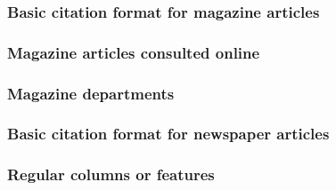 \documentclass[11pt,letterpaper,oneside]{article}
\begin{document}
\setcounter{subsubsection}{187}
\subsubsection{Basic citation format for magazine articles}

\begin{citebib}
\item \cite[48]{saulnier2008}
\item \cite[59]{lepore2015}
\end{citebib}

\subsubsection{Magazine articles consulted online}

\begin{citebib}
\item \cite{vick2015}
\item \cite[5]{hanemann1926}
\end{citebib}

\subsubsection{Magazine departments}

\begin{citebib}
\item \cite{marx2015}
\item \cite{wallraff2008}
\item \cite{gourmet2000}
\end{citebib}

\subsubsection{Basic citation format for newspaper articles}

\begin{citebib}
\item \cite{editorial1990}
\item \cite{royko1992}
\item \cite{forester2000}
\item \cite{samenow2016}
\end{citebib}

\setcounter{subsubsection}{194}
\subsubsection{Regular columns or features}
\end{document}
